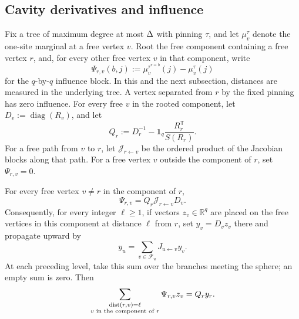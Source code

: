 \subsection{Cavity derivatives and influence}

Fix a tree of maximum degree at most \(\Delta\) with pinning \(\tau\), and
let \(\mu_v^\tau\) denote the one-site marginal at a free vertex \(v\).
Root the free component containing a free vertex \(r\), and, for every
other free vertex \(v\) in that component, write
\[
 \Psi_{r,v}(b,j)
 :=\mu_v^{\tau^{r=b}}(j)-\mu_v^\tau(j)
\]
for the \(q\)-by-\(q\) influence block.  In this and the next subsection,
distances are measured in the underlying tree.  A vertex separated from
$r$ by the fixed pinning has zero influence.  For every free \(v\) in the
rooted component, let \(D_v:=\operatorname{diag}(R_v)\), and let
\begin{equation}
 Q_r:=D_r^{-1}-\mathbf1_q\frac{R_r^{\mathsf T}}{S(R_r)}.
 \label{eq:bbr-D-Q}
\end{equation}
For a free path from \(v\) to \(r\), let
\(\mathcal J_{r\leftarrow v}\) be the ordered product of the Jacobian
blocks along that path.  For a free vertex \(v\) outside the component of
\(r\), set \(\Psi_{r,v}=0\).

\begin{lemma}
\label{lem:bbr-influence-factorization}
For every free vertex \(v\ne r\) in the component of \(r\),
\begin{equation}
 \Psi_{r,v}=Q_r\mathcal J_{r\leftarrow v}D_v.
 \label{eq:bbr-influence-factorization}
\end{equation}
Consequently, for every integer \(\ell\ge1\), if vectors
\(z_v\in\mathbb R^q\) are placed on the free vertices in this component
at distance \(\ell\) from \(r\), set \(y_v=D_vz_v\) there and
propagate upward by
\begin{equation}
 y_u=\sum_{v\in\mathcal F_u}J_{u\leftarrow v}y_v.
 \label{eq:bbr-upward-derivative}
\end{equation}
At each preceding level, take this sum over the branches meeting the
sphere; an empty sum is zero.
Then
\begin{equation}
 \sum_{\substack{\operatorname{dist}(r,v)=\ell\\v\text{ in the component of }r}}
 \Psi_{r,v}z_v=Q_ry_r.
 \label{eq:bbr-level-factorization}
\end{equation}
\end{lemma}

